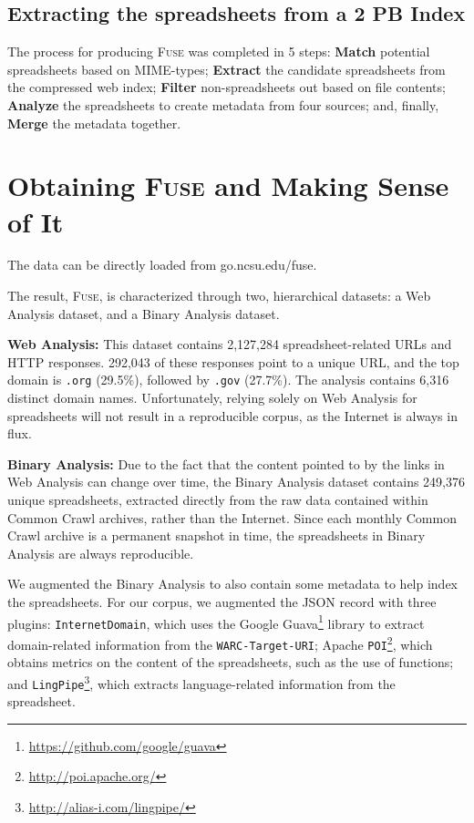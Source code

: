 \documentclass[conference]{IEEEtran}
\newcommand{\urlcount}{2,127,284}
\newcommand{\xlscount}{249,376}
\begin{document}
\subsection{Extracting the spreadsheets from a 2 PB Index}

The process for producing \textsc{Fuse} was completed in 5 steps: \textbf{Match} potential spreadsheets based on MIME-types; \textbf{Extract} the candidate spreadsheets from the compressed web index; \textbf{Filter} non-spreadsheets out based on file contents; \textbf{Analyze} the spreadsheets to create metadata from four sources; and, finally, \textbf{Merge} the metadata together.


\section{Obtaining \textsc{Fuse} and Making Sense of It}

The data can be directly loaded from go.ncsu.edu/fuse.

The result, \textsc{Fuse}, is characterized through two, hierarchical datasets: a Web Analysis dataset, and a Binary Analysis dataset.

\textbf{Web Analysis:} This dataset contains \urlcount{} spreadsheet-related URLs and HTTP responses. 292,043 of these responses point to a unique URL, and the top domain is \texttt{.org} (29.5\%), followed by \texttt{.gov} (27.7\%). 
The analysis contains 6,316 distinct domain names. Unfortunately, relying solely on Web Analysis for spreadsheets will not result in a reproducible corpus, as the Internet is always in flux.

\textbf{Binary Analysis:}  Due to the fact that the content pointed to by the links in Web Analysis can change over time, the Binary Analysis dataset contains \xlscount{} unique spreadsheets, extracted directly from the raw data contained within Common Crawl archives, rather than the Internet. 
Since each monthly Common Crawl archive is a permanent snapshot in time, the spreadsheets in Binary Analysis are always reproducible.

We augmented the Binary Analysis to also contain some metadata to help index the spreadsheets.
For our corpus, we augmented the JSON record with three plugins: 
\texttt{InternetDomain}, which uses the Google Guava\footnote{\url{https://github.com/google/guava}} library to extract domain-related information from the \texttt{WARC-Target-URI};
Apache \texttt{POI}\footnote{\url{http://poi.apache.org/}}, which obtains metrics on the content of the spreadsheets, such as the use of functions;
and \texttt{LingPipe}\footnote{\url{http://alias-i.com/lingpipe/}}, which extracts language-related information from the spreadsheet. 
\end{document}
